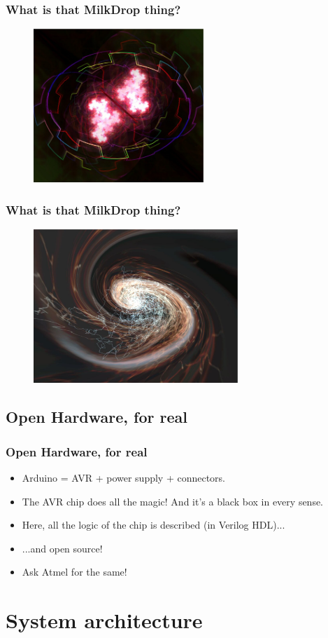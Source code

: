 \documentclass{beamer}
\begin{document}
\frame
{
  \frametitle{What is that MilkDrop thing?}
  \begin{figure}[H]
  \includegraphics[height=58mm]{milkdrop2.eps}
  \end{figure}
}

\frame
{
  \frametitle{What is that MilkDrop thing?}
  \begin{figure}[H]
  \includegraphics[height=58mm]{milkdrop3.eps}
  \end{figure}
}

\subsection{Open Hardware, for real}
\frame
{
  \frametitle{Open Hardware, for real}

  \begin{itemize}
  \item Arduino = AVR + power supply + connectors.
  \item The AVR chip does all the magic! And it's a black box in every sense.
  \item Here, all the logic of the chip is described (in Verilog HDL)...
  \item ...and open source!
  \item Ask Atmel for the same!
  \end{itemize}
}


\section{System architecture}
\end{document}
